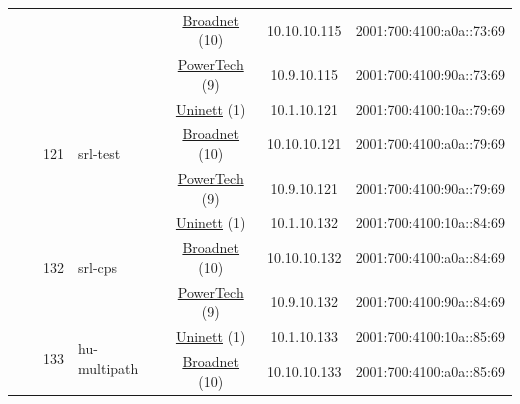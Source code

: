 \begin{small}
\begin{center}
\begin{longtable}{|c|c|c|c|c|c|c|c|}
  &  &  &  & \multicolumn{2}{|c|}{\tiny{\href{https://www.broadnet.no}{Broadnet} (10)}} & \tiny{10.10.10.115} & \tiny{2001:700:4100:a0a::73:69} \\* \cline{5-5}\cline{6-6}\cline{7-7}\cline{8-8}
  &  &  &  & \multicolumn{2}{|c|}{\tiny{\href{http://www.powertech.no}{PowerTech} (9)}} & \tiny{10.9.10.115} & \tiny{2001:700:4100:90a::73:69} \\* \cline{3-3}\cline{4-4}\cline{5-5}\cline{6-6}\cline{7-7}\cline{8-8}
  &  & \multirow{3}{*}{\tiny{121}} & \multicolumn{1}{|l|}{\multirow{3}{*}{\tiny{srl-test}}} & \multicolumn{2}{|c|}{\tiny{\href{https://www.uninett.no}{Uninett} (1)}} & \tiny{10.1.10.121} & \tiny{2001:700:4100:10a::79:69} \\* \cline{5-5}\cline{6-6}\cline{7-7}\cline{8-8}
  &  &  &  & \multicolumn{2}{|c|}{\tiny{\href{https://www.broadnet.no}{Broadnet} (10)}} & \tiny{10.10.10.121} & \tiny{2001:700:4100:a0a::79:69} \\* \cline{5-5}\cline{6-6}\cline{7-7}\cline{8-8}
  &  &  &  & \multicolumn{2}{|c|}{\tiny{\href{http://www.powertech.no}{PowerTech} (9)}} & \tiny{10.9.10.121} & \tiny{2001:700:4100:90a::79:69} \\* \cline{3-3}\cline{4-4}\cline{5-5}\cline{6-6}\cline{7-7}\cline{8-8}
  &  & \multirow{3}{*}{\tiny{132}} & \multicolumn{1}{|l|}{\multirow{3}{*}{\tiny{srl-cps}}} & \multicolumn{2}{|c|}{\tiny{\href{https://www.uninett.no}{Uninett} (1)}} & \tiny{10.1.10.132} & \tiny{2001:700:4100:10a::84:69} \\* \cline{5-5}\cline{6-6}\cline{7-7}\cline{8-8}
  &  &  &  & \multicolumn{2}{|c|}{\tiny{\href{https://www.broadnet.no}{Broadnet} (10)}} & \tiny{10.10.10.132} & \tiny{2001:700:4100:a0a::84:69} \\* \cline{5-5}\cline{6-6}\cline{7-7}\cline{8-8}
  &  &  &  & \multicolumn{2}{|c|}{\tiny{\href{http://www.powertech.no}{PowerTech} (9)}} & \tiny{10.9.10.132} & \tiny{2001:700:4100:90a::84:69} \\* \cline{3-3}\cline{4-4}\cline{5-5}\cline{6-6}\cline{7-7}\cline{8-8}
  &  & \multirow{3}{*}{\tiny{133}} & \multicolumn{1}{|l|}{\multirow{3}{*}{\tiny{hu-multipath}}} & \multicolumn{2}{|c|}{\tiny{\href{https://www.uninett.no}{Uninett} (1)}} & \tiny{10.1.10.133} & \tiny{2001:700:4100:10a::85:69} \\* \cline{5-5}\cline{6-6}\cline{7-7}\cline{8-8}
  &  &  &  & \multicolumn{2}{|c|}{\tiny{\href{https://www.broadnet.no}{Broadnet} (10)}} & \tiny{10.10.10.133} & \tiny{2001:700:4100:a0a::85:69} \\* \cline{5-5}\cline{6-6}\cline{7-7}\cline{8-8}

\end{longtable}
\end{center}
\end{small}
